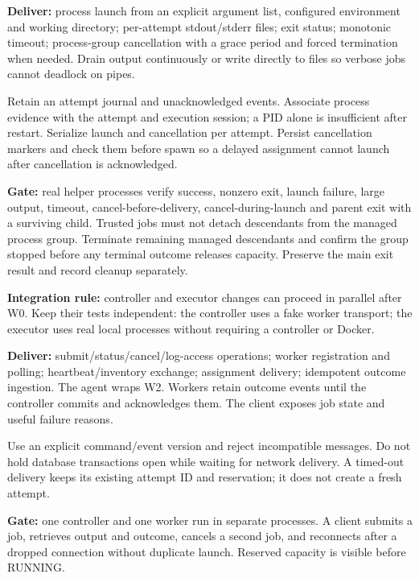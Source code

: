 \documentclass[10pt,letterpaper]{article}
\newcommand{\pagetitle}[2]{\vspace*{1pt}{\small\bfseries\color{accent}#1}\par\vspace{3pt}{\displayfont\fontsize{24}{28}\selectfont #2}\par\vspace{7pt}}
\newcommand{\packet}[2]{\par\vspace{9pt}{\large\bfseries\color{accent}#1}\hspace{6pt}{\large\bfseries #2}\par}
\newcommand{\callout}[1]{\par\vspace{5pt}\begingroup\setlength{\fboxsep}{10pt}\colorbox{light}{\parbox{\dimexpr\linewidth-20pt\relax}{#1}}\endgroup\par\vspace{5pt}}
\begin{document}
\packet{W2}{Build a local executor library}
\textbf{Deliver:} process launch from an explicit argument list, configured environment
and working directory; per-attempt stdout/stderr files; exit status; monotonic timeout;
process-group cancellation with a grace period and forced termination when needed.
Drain output continuously or write directly to files so verbose jobs cannot deadlock on pipes.

Retain an attempt journal and unacknowledged events. Associate process evidence with the
attempt and execution session; a PID alone is insufficient after restart. Serialize
launch and cancellation per attempt. Persist cancellation markers and check them before
spawn so a delayed assignment cannot launch after cancellation is acknowledged.

\textbf{Gate:} real helper processes verify success, nonzero exit, launch failure,
large output, timeout, cancel-before-delivery, cancel-during-launch and parent exit with a
surviving child. Trusted jobs must not detach descendants from the managed process group.
Terminate remaining managed descendants and confirm the group stopped before any terminal
outcome releases capacity. Preserve the main exit result and record cleanup separately.

\callout{\textbf{Integration rule:} controller and executor changes can proceed in parallel
after W0. Keep their tests independent: the controller uses a fake worker transport;
the executor uses real local processes without requiring a controller or Docker.}

\newpage
\pagetitle{RUNTIME WORK}{Connect, package and recover.}

\packet{W3}{Add the API, worker agent and client}
\textbf{Deliver:} submit/status/cancel/log-access operations; worker registration and
polling; heartbeat/inventory exchange; assignment delivery; idempotent outcome ingestion.
The agent wraps W2. Workers retain outcome events until the controller commits and
acknowledges them. The client exposes job state and useful failure reasons.

Use an explicit command/event version and reject incompatible messages. Do not hold
database transactions open while waiting for network delivery. A timed-out delivery
keeps its existing attempt ID and reservation; it does not create a fresh attempt.

\textbf{Gate:} one controller and one worker run in separate processes. A client submits
a job, retrieves output and outcome, cancels a second job, and reconnects after a dropped
connection without duplicate launch. Reserved capacity is visible before RUNNING.
\end{document}
